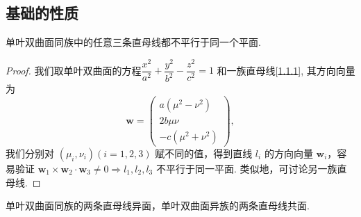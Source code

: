\documentclass[12pt, a4paper,newtx]{ctexart}
\begin{document}
\subsection{基础的性质}
\begin{property}{}{}
	单叶双曲面同族中的任意三条直母线都不平行于同一个平面. 
\end{property}
\begin{proof}
	我们取单叶双曲面的方程$\dfrac{x^2}{a^2} + \dfrac{y^2}{b^2} - \dfrac{z^2}{c^2} = 1$
	和一族直母线\eqref{1.1.1},
	其方向向量为
	\[
	\bm{w} = \begin{pmatrix}
		a(\mu^2 - \nu^2) \\
		2b\mu\nu \\
		-c(\mu^2 + \nu^2)
	\end{pmatrix},
	\]
	我们分别对 \((\mu_i, \nu_i)(i = 1, 2, 3)\) 赋不同的值，得到直线 \(l_i\) 的方向向量 \(\bm{w}_i\)，容易验证 \(\bm{w}_1 \times \bm{w}_2 \cdot \bm{w}_3 \neq 0 \Longrightarrow l_1, l_2, l_3\) 不平行于同一平面. 类似地，可讨论另一族直母线. 
\end{proof}
\begin{property}{}{}
	单叶双曲面同族的两条直母线异面，单叶双曲面异族的两条直母线共面. 
\end{property}
\end{document}
